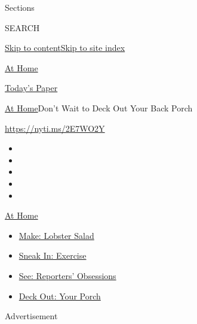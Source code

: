 Sections

SEARCH

\protect\hyperlink{site-content}{Skip to
content}\protect\hyperlink{site-index}{Skip to site index}

\href{https://www.nytimes3xbfgragh.onion/spotlight/at-home}{At Home}

\href{https://myaccount.nytimes3xbfgragh.onion/auth/login?response_type=cookie\&client_id=vi}{}

\href{https://www.nytimes3xbfgragh.onion/section/todayspaper}{Today's
Paper}

\href{/spotlight/at-home}{At Home}\textbar{}Don't Wait to Deck Out Your
Back Porch

\url{https://nyti.ms/2E7WO2Y}

\begin{itemize}
\item
\item
\item
\item
\item
\end{itemize}

\href{https://www.nytimes3xbfgragh.onion/spotlight/at-home?action=click\&pgtype=Article\&state=default\&region=TOP_BANNER\&context=at_home_menu}{At
Home}

\begin{itemize}
\tightlist
\item
  \href{https://www.nytimes3xbfgragh.onion/2020/08/14/dining/lobster-salad-recipe.html?action=click\&pgtype=Article\&state=default\&region=TOP_BANNER\&context=at_home_menu}{Make:
  Lobster Salad}
\item
  \href{https://www.nytimes3xbfgragh.onion/2020/08/15/at-home/coronavirus-at-home-quick-exercises.html?action=click\&pgtype=Article\&state=default\&region=TOP_BANNER\&context=at_home_menu}{Sneak
  In: Exercise}
\item
  \href{https://www.nytimes3xbfgragh.onion/interactive/2020/at-home/even-more-reporters-editors-diaries-lists-recommendations.html?action=click\&pgtype=Article\&state=default\&region=TOP_BANNER\&context=at_home_menu}{See:
  Reporters' Obsessions}
\item
  \href{https://www.nytimes3xbfgragh.onion/2020/08/15/at-home/coronavirus-fall-patio-furniture.html?action=click\&pgtype=Article\&state=default\&region=TOP_BANNER\&context=at_home_menu}{Deck
  Out: Your Porch}
\end{itemize}

Advertisement


